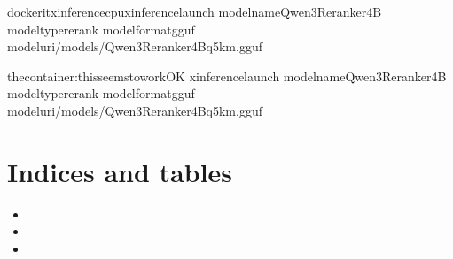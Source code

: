 \documentclass[letterpaper,10pt,english]{sphinxmanual}
\begin{document}
\begin{sphinxVerbatim}[commandchars=\\\{\}]
docker\PYGZhy{}itxinference\PYGZhy{}cpuxinferencelaunch
\PYGZhy{}\PYGZhy{}model\PYGZhy{}nameQwen3\PYGZhy{}Reranker\PYGZhy{}4B
\PYGZhy{}\PYGZhy{}model\PYGZhy{}typererank
\PYGZhy{}\PYGZhy{}
\PYGZhy{}\PYGZhy{}model\PYGZhy{}formatgguf
\PYGZhy{}\PYGZhy{}model\PYGZhy{}uri/models/Qwen3\PYGZhy{}Reranker\PYGZhy{}4B\PYGZhy{}q5\PYGZus{}k\PYGZus{}m.gguf


thecontainer:thisseemstoworkOK
xinferencelaunch
\PYGZhy{}\PYGZhy{}model\PYGZhy{}nameQwen3\PYGZhy{}Reranker\PYGZhy{}4B
\PYGZhy{}\PYGZhy{}model\PYGZhy{}typererank
\PYGZhy{}\PYGZhy{}
\PYGZhy{}\PYGZhy{}model\PYGZhy{}formatgguf
\PYGZhy{}\PYGZhy{}model\PYGZhy{}uri/models/Qwen3\PYGZhy{}Reranker\PYGZhy{}4B\PYGZhy{}q5\PYGZus{}k\PYGZus{}m.gguf
\end{sphinxVerbatim}


\chapter{Indices and tables}
\label{\detokenize{index:indices-and-tables}}\begin{itemize}
\item {} 
\sphinxAtStartPar
{}

\item {} 
\sphinxAtStartPar
{}

\item {} 
\sphinxAtStartPar
{}

\end{itemize}



\renewcommand{\indexname}{Index}
\printindex
\end{document}
